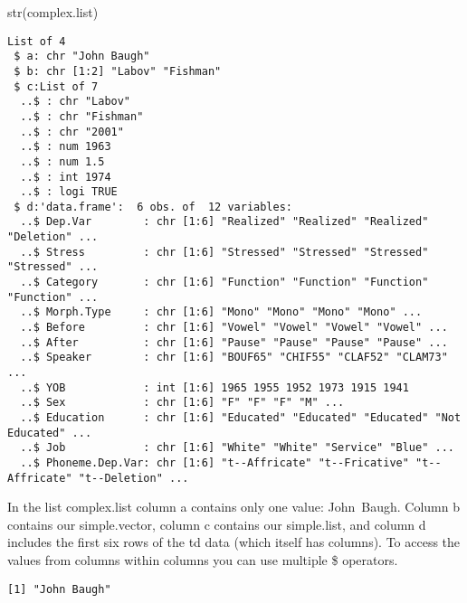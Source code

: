 \documentclass[
  10pt,
  letterpaper]{article}
\newenvironment{Shaded}{\begin{snugshade}}{\end{snugshade}}
\newcommand{\FunctionTok}[1]{\textcolor[rgb]{0.28,0.35,0.67}{#1}}
\newcommand{\NormalTok}[1]{\textcolor[rgb]{0.00,0.23,0.31}{#1}}
\newcommand{\SpecialCharTok}[1]{\textcolor[rgb]{0.37,0.37,0.37}{#1}}
\renewcommand\texttt[1]{{\ttfamily\color{BrickRed}#1}}
\begin{document}
\begin{Shaded}
\begin{Highlighting}[]
\FunctionTok{str}\NormalTok{(complex.list)}
\end{Highlighting}
\end{Shaded}

\begin{verbatim}
List of 4
 $ a: chr "John Baugh"
 $ b: chr [1:2] "Labov" "Fishman"
 $ c:List of 7
  ..$ : chr "Labov"
  ..$ : chr "Fishman"
  ..$ : chr "2001"
  ..$ : num 1963
  ..$ : num 1.5
  ..$ : int 1974
  ..$ : logi TRUE
 $ d:'data.frame':  6 obs. of  12 variables:
  ..$ Dep.Var        : chr [1:6] "Realized" "Realized" "Realized" "Deletion" ...
  ..$ Stress         : chr [1:6] "Stressed" "Stressed" "Stressed" "Stressed" ...
  ..$ Category       : chr [1:6] "Function" "Function" "Function" "Function" ...
  ..$ Morph.Type     : chr [1:6] "Mono" "Mono" "Mono" "Mono" ...
  ..$ Before         : chr [1:6] "Vowel" "Vowel" "Vowel" "Vowel" ...
  ..$ After          : chr [1:6] "Pause" "Pause" "Pause" "Pause" ...
  ..$ Speaker        : chr [1:6] "BOUF65" "CHIF55" "CLAF52" "CLAM73" ...
  ..$ YOB            : int [1:6] 1965 1955 1952 1973 1915 1941
  ..$ Sex            : chr [1:6] "F" "F" "F" "M" ...
  ..$ Education      : chr [1:6] "Educated" "Educated" "Educated" "Not Educated" ...
  ..$ Job            : chr [1:6] "White" "White" "Service" "Blue" ...
  ..$ Phoneme.Dep.Var: chr [1:6] "t--Affricate" "t--Fricative" "t--Affricate" "t--Deletion" ...
\end{verbatim}

In the list \texttt{complex.list} column \texttt{a} contains only one
value: \texttt{John\ Baugh}. Column \texttt{b} contains our
\texttt{simple.vector}, column \texttt{c} contains our
\texttt{simple.list}, and column \texttt{d} includes the first six rows
of the \texttt{td} data (which itself has columns). To access the values
from columns within columns you can use multiple \texttt{\$} operators.

\begin{Shaded}
\end{Shaded}

\begin{verbatim}
[1] "John Baugh"
\end{verbatim}

\begin{Shaded}
\end{Shaded}
\end{document}
